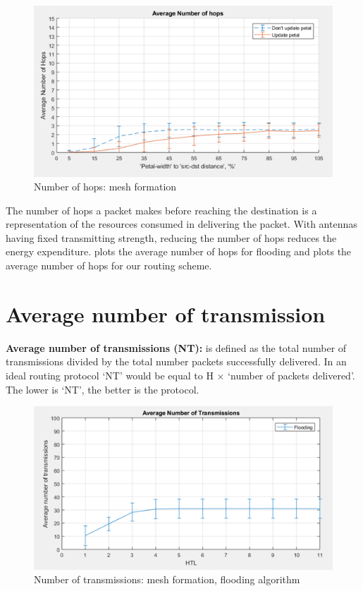 \begin{figure}[hbtp]
\centering
\includegraphics[width=\textwidth,height=\textheight,keepaspectratio]{ncsuthesis-0.6/Chapter-5/figs/pe_hop_random.png}
\caption{Number of hops: mesh formation}
\label{fig:pe_hops_random}
\end{figure}


The number of hops a packet makes before reaching the destination is a representation of the resources consumed in delivering the packet. With antennas having fixed transmitting strength, reducing the number of hops reduces the energy expenditure.  plots the average number of hops for flooding and  plots the average number of hops for our routing scheme.

\section{Average number of transmission}
    \textbf{Average number of transmissions (NT):} is defined as the total number of transmissions divided by the total number packets successfully delivered. In an ideal routing protocol `NT' would be equal to H $\times$ `number of packets delivered'. The lower is `NT', the better is the protocol. 
    
\begin{figure}[hbtp]
\centering
\includegraphics[width=\textwidth,height=\textheight,keepaspectratio]{ncsuthesis-0.6/Chapter-5/figs/fl_trans_mesh.png}
\caption{Number of transmissions: mesh formation, flooding algorithm}
\label{fig:fl_trans_mesh}
\end{figure}

